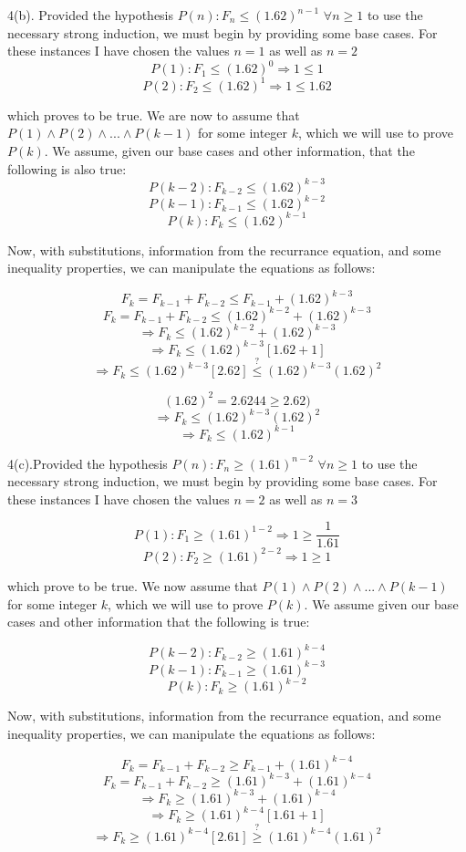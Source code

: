 \documentclass[10pt]{article}
\begin{document}
4(b). Provided the hypothesis $P(n): F_n \leq (1.62)^{n-1}$ $\forall n \geq 1$ to use the necessary strong induction, we must begin by providing some base cases.  For these instances I have chosen the values $n=1$ as well as $n=2$
$$P(1): F_1 \leq (1.62)^0 \Rightarrow 1 \leq 1$$
$$P(2): F_2 \leq (1.62)^1 \Rightarrow 1 \leq 1.62$$

which proves to be true.  We are now to assume that $P(1) \wedge P(2) \wedge ... \wedge P(k-1)$ for some integer $k$, which we will use to prove $P(k)$.  We assume, given our base cases and other information, that the following is also true:
$$P(k-2): F_{k-2} \leq (1.62)^{k-3}$$
$$P(k-1): F_{k-1} \leq (1.62)^{k-2}$$
$$P(k): F_k \leq (1.62)^{k-1}$$

Now, with substitutions, information from the recurrance equation, and some inequality properties, we can manipulate the equations as follows:

$$F_k = F_{k-1} + F_{k-2} \leq F_{k-1} + (1.62)^{k-3}$$
$$F_k = F_{k-1} + F_{k-2} \leq (1.62)^{k-2} + (1.62)^{k-3}$$
$$\Rightarrow F_k \leq (1.62)^{k-2} + (1.62)^{k-3}$$
$$\Rightarrow F_k \leq (1.62)^{k-3}[1.62 + 1]$$
$$\Rightarrow F_k \leq (1.62)^{k-3}[2.62]\stackrel{?}{\leq}(1.62)^{k-3}(1.62)^2$$

$$(1.62)^2 = 2.6244 \geq 2.62)$$
$$\Rightarrow F_k \leq (1.62)^{k-3}(1.62)^2$$
$$\Rightarrow F_k \leq (1.62)^{k-1}$$

4(c).Provided the hypothesis $P(n): F_n \geq (1.61)^{n-2}$ $\forall n \geq 1$ to use the necessary strong induction, we must begin by providing some base cases.  For these instances I have chosen the values $n=2$ as well as $n=3$

$$P(1): F_1 \geq (1.61)^{1-2} \Rightarrow 1 \geq \frac{1}{1.61}$$
$$P(2): F_2 \geq (1.61)^{2-2} \Rightarrow 1 \geq 1$$

which prove to be true.  We now assume that $P(1) \wedge P(2) \wedge ... \wedge P(k-1)$ for some integer $k$, which we will use to prove $P(k)$.  We assume given our base cases and other information that the following is true:

$$P(k-2): F_{k-2} \geq (1.61)^{k-4}$$
$$P(k-1): F_{k-1} \geq (1.61)^{k-3}$$
$$P(k): F_k \geq (1.61)^{k-2}$$

Now, with substitutions, information from the recurrance equation, and some inequality properties, we can manipulate the equations as follows:

$$F_k = F_{k-1} + F_{k-2} \geq F_{k-1} + (1.61)^{k-4}$$
$$F_k = F_{k-1} + F_{k-2} \geq (1.61)^{k-3} + (1.61)^{k-4}$$ 
$$\Rightarrow F_k \geq (1.61)^{k-3} + (1.61)^{k-4}$$
$$\Rightarrow F_k \geq (1.61)^{k-4}[1.61 + 1]$$
$$\Rightarrow F_k \geq (1.61)^{k-4}[2.61]\stackrel{?}{\geq}(1.61)^{k-4}(1.61)^2$$
\end{document}
